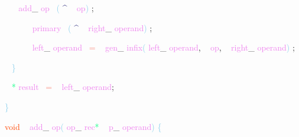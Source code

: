 \documentclass[8, usernames, dvipsnames]{beamer}
\begin{document}
\begin{frame}
\textcolor{White}{\   }
\textcolor{White}{\   }
\textcolor{Violet}{add}\textcolor{Sepia}{\_}
\textcolor{Violet}{op}\textcolor{White}{\ }
\textcolor{SkyBlue}{(}
\textcolor{MidnightBlue}{\textasciicircum}
\textcolor{White}{\ }
\textcolor{Violet}{op}\textcolor{SkyBlue}{)}
\textcolor{Sepia}{;}

 \textcolor{White}{\   }
\textcolor{White}{\   }
\textcolor{White}{\   }
\textcolor{White}{\   }
\textcolor{Violet}{primary}\textcolor{White}{\ }
\textcolor{SkyBlue}{(}
\textcolor{MidnightBlue}{\textasciicircum}
\textcolor{White}{\ }
\textcolor{Violet}{right}\textcolor{Sepia}{\_}
\textcolor{Violet}{operand}\textcolor{SkyBlue}{)}
\textcolor{Sepia}{;}

 \textcolor{White}{\   }
\textcolor{White}{\   }
\textcolor{White}{\   }
\textcolor{White}{\   }
\textcolor{Violet}{left}\textcolor{Sepia}{\_}
\textcolor{Violet}{operand}\textcolor{White}{\ }
\textcolor{Salmon}{=}
\textcolor{White}{\ }
\textcolor{Violet}{gen}\textcolor{Sepia}{\_}
\textcolor{Violet}{infix}\textcolor{SkyBlue}{(}
\textcolor{Violet}{left}\textcolor{Sepia}{\_}
\textcolor{Violet}{operand}\textcolor{Sepia}{,}
\textcolor{White}{\ }
\textcolor{Violet}{op}\textcolor{Sepia}{,}
\textcolor{White}{\ }
\textcolor{Violet}{right}\textcolor{Sepia}{\_}
\textcolor{Violet}{operand}\textcolor{SkyBlue}{)}
\textcolor{Sepia}{;}

 \textcolor{White}{\   }
\textcolor{SkyBlue}{\} }

 \textcolor{White}{\   }
\textcolor{SpringGreen}{*}
\textcolor{Violet}{result}\textcolor{White}{\ }
\textcolor{Salmon}{=}
\textcolor{White}{\ }
\textcolor{Violet}{left}\textcolor{Sepia}{\_}
\textcolor{Violet}{operand}\textcolor{Sepia}{;}

 \textcolor{SkyBlue}{\} }

 
 
 
 \textcolor{OrangeRed}{void}
\textcolor{White}{\ }
\textcolor{Violet}{add}\textcolor{Sepia}{\_}
\textcolor{Violet}{op}\textcolor{SkyBlue}{(}
\textcolor{Violet}{op}\textcolor{Sepia}{\_}
\textcolor{Violet}{rec}\textcolor{SpringGreen}{*}
\textcolor{White}{\ }
\textcolor{Violet}{p}\textcolor{Sepia}{\_}
\textcolor{Violet}{operand}\textcolor{SkyBlue}{)}
\textcolor{SkyBlue}{\{ }

 \end{frame}
\end{document}
